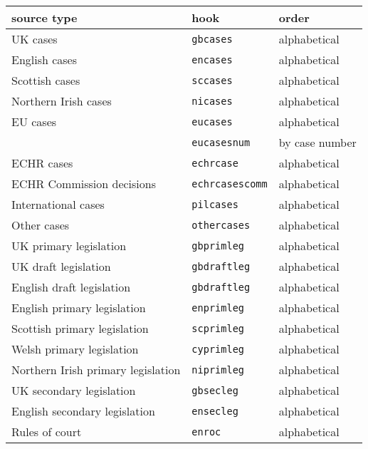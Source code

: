 \documentclass[a5paper,fontsize=9pt,DIV=1]{scrartcl}
\begin{document}
\begin{table}
\centering
\small
{}
\begin{tabular}{lll}
\toprule
source type                          & hook                  & order \\
\midrule
UK cases                             & \texttt{gbcases}      & alphabetical\\
English cases                        & \texttt{encases}      & alphabetical\\
Scottish cases                       & \texttt{sccases}      & alphabetical\\
Northern Irish cases                 & \texttt{nicases}      & alphabetical\\
EU cases                             & \texttt{eucases}      & alphabetical \\
                                     & \texttt{eucasesnum}   & by case number \\
ECHR cases                           & \texttt{echrcase}     & alphabetical \\
ECHR Commission decisions            & \texttt{echrcasescomm}& alphabetical \\
International cases                  & \texttt{pilcases}     & alphabetical \\
Other cases                          & \texttt{othercases}   & alphabetical \\
UK primary legislation               & \texttt{gbprimleg}    & alphabetical \\
UK draft legislation                 & \texttt{gbdraftleg}   & alphabetical \\
English draft legislation            & \texttt{gbdraftleg}   & alphabetical \\
English primary legislation          & \texttt{enprimleg}    & alphabetical \\
Scottish primary legislation         & \texttt{scprimleg}    & alphabetical \\
Welsh primary legislation            & \texttt{cyprimleg}    & alphabetical \\
Northern Irish primary legislation   & \texttt{niprimleg}    & alphabetical \\
UK secondary legislation             & \texttt{gbsecleg}     & alphabetical \\
English secondary legislation        & \texttt{ensecleg}     & alphabetical \\
Rules of court                       & \texttt{enroc}        & alphabetical \\

\end{tabular}
\end{table}
\end{document}
